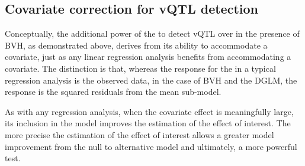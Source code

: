 \subsection{Covariate correction for vQTL detection}
Conceptually, the additional power of the \DGLMv to detect vQTL over \Caov in the presence of BVH, as demonstrated above, derives from its ability to accommodate a covariate, just as any linear regression analysis benefits from accommodating a covariate.
The distinction is that, whereas the response for the in a typical regression analysis is the observed data, in the case of BVH and the DGLM, the response is the squared residuals from the mean sub-model.

As with any regression analysis, when the covariate effect is meaningfully large, its inclusion in the model improves the estimation of the effect of interest.
The more precise the estimation of the effect of interest allows a greater model improvement from the null to alternative model and ultimately, a more powerful test.







